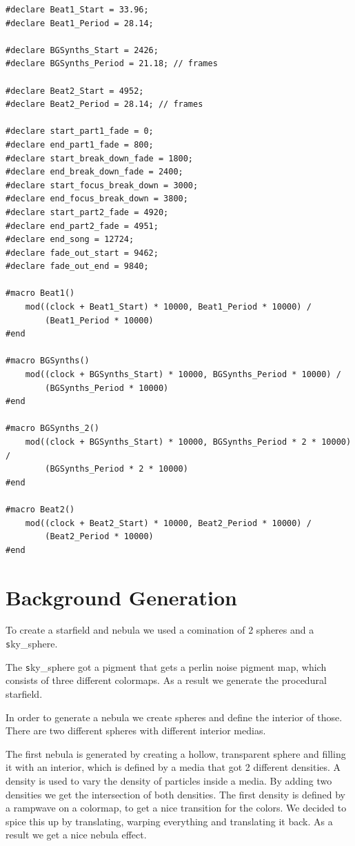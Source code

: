 \documentclass[a4paper, 12pt]{scrartcl}
\begin{document}
    \begin{verbatim}
#declare Beat1_Start = 33.96;
#declare Beat1_Period = 28.14;

#declare BGSynths_Start = 2426;
#declare BGSynths_Period = 21.18; // frames

#declare Beat2_Start = 4952;
#declare Beat2_Period = 28.14; // frames

#declare start_part1_fade = 0;
#declare end_part1_fade = 800;
#declare start_break_down_fade = 1800;
#declare end_break_down_fade = 2400;
#declare start_focus_break_down = 3000;
#declare end_focus_break_down = 3800;
#declare start_part2_fade = 4920;
#declare end_part2_fade = 4951;
#declare end_song = 12724;
#declare fade_out_start = 9462;
#declare fade_out_end = 9840;

#macro Beat1()
    mod((clock + Beat1_Start) * 10000, Beat1_Period * 10000) /
        (Beat1_Period * 10000)
#end

#macro BGSynths()
    mod((clock + BGSynths_Start) * 10000, BGSynths_Period * 10000) /
        (BGSynths_Period * 10000)
#end

#macro BGSynths_2()
    mod((clock + BGSynths_Start) * 10000, BGSynths_Period * 2 * 10000) /
        (BGSynths_Period * 2 * 10000)
#end

#macro Beat2()
    mod((clock + Beat2_Start) * 10000, Beat2_Period * 10000) /
        (Beat2_Period * 10000)
#end
    \end{verbatim}

    \section{Background Generation}
    \label{sec:background}

    To create a starfield and nebula we used a comination of 2 spheres and a \texttt sky\_sphere.

    The \texttt sky\_sphere got a pigment that gets a perlin noise pigment map, which consists of
    three different colormaps. As a result we generate the procedural starfield.
    
    In order to generate a nebula we create spheres and define the interior of those. There are two
    different spheres with different interior medias.

    The first nebula is generated by creating a hollow, transparent sphere and filling it with an
    interior, which is defined by a media that got 2 different densities. A density is used to vary
    the density of particles inside a media.  By adding two densities we get the intersection of
    both densities. The first density is defined by a rampwave on a colormap, to get a nice
    transition for the colors. We decided to spice this up by translating, warping everything and
    translating it back. As a result we get a nice nebula effect.
    
\end{document}
